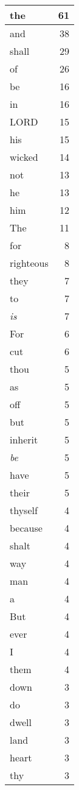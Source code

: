 \begin{center}
\begin{longtable}{l|r}
\hline \hline
\endlastfoot
the & 61 \\ \hline
and & 38 \\ \hline
shall & 29 \\ \hline
of & 26 \\ \hline
be & 16 \\ \hline
in & 16 \\ \hline
LORD & 15 \\ \hline
his & 15 \\ \hline
wicked & 14 \\ \hline
not & 13 \\ \hline
he & 13 \\ \hline
him & 12 \\ \hline
The & 11 \\ \hline
for & 8 \\ \hline
righteous & 8 \\ \hline
they & 7 \\ \hline
to & 7 \\ \hline
\emph{is} & 7 \\ \hline
For & 6 \\ \hline
cut & 6 \\ \hline
thou & 5 \\ \hline
as & 5 \\ \hline
off & 5 \\ \hline
but & 5 \\ \hline
inherit & 5 \\ \hline
\emph{be} & 5 \\ \hline
have & 5 \\ \hline
their & 5 \\ \hline
thyself & 4 \\ \hline
because & 4 \\ \hline
shalt & 4 \\ \hline
way & 4 \\ \hline
man & 4 \\ \hline
a & 4 \\ \hline
But & 4 \\ \hline
ever & 4 \\ \hline
I & 4 \\ \hline
them & 4 \\ \hline
down & 3 \\ \hline
do & 3 \\ \hline
dwell & 3 \\ \hline
land & 3 \\ \hline
heart & 3 \\ \hline
thy & 3 \\ \hline

\end{longtable}
\end{center}

